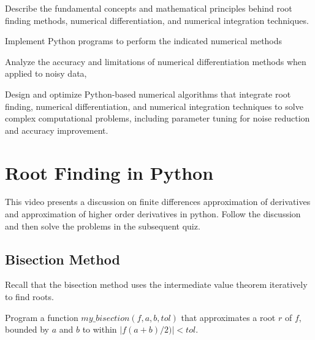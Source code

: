 \begin{mlos}
\item Describe the fundamental concepts and mathematical principles behind root finding methods, numerical differentiation, and numerical integration techniques.
\item Implement Python programs to perform the indicated numerical methods
\item Analyze the accuracy and limitations of numerical differentiation methods when applied to noisy data,\item Design and optimize Python-based numerical algorithms that integrate root finding, numerical differentiation, and numerical integration techniques to solve complex computational problems, including parameter tuning for noise reduction and accuracy improvement.
\end{mlos}

\section{Root Finding in Python}
\videolesson
\begin{selfvideo}[1]
This video presents a discussion on finite differences approximation of derivatives and approximation of higher order derivatives in python. Follow the discussion and then solve the problems in the subsequent quiz.
\end{selfvideo}
\subsection*{Bisection Method}
Recall that the bisection method uses the intermediate value theorem iteratively to find roots.

\begin{example}
Program a function $my\_bisection(f, a, b, tol)$ that approximates a root $r$ of $f$, bounded by $a$ and $b$ to within $|f(a+b)/2)|<tol$.
\end{example}

